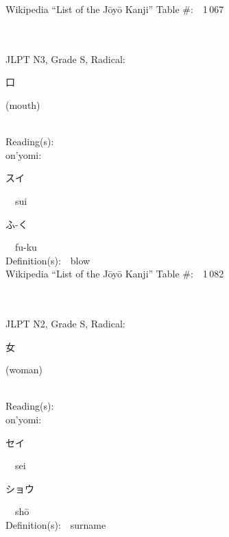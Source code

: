 \begin{multicols}{2}
Wikipedia ``List of the J\=oy\=o Kanji'' Table \#:\ \ 1\,067 \\
\ \ \\
{\fontsize{34pt}{40pt}  }\ \ \\  %
{JLPT N3, Grade S, Radical:\ \ {\begin{CJK}{UTF8}{min} 口 \end{CJK}} (mouth) } \\
Reading(s):\ \ \\
{\hspace*{1em}}on'yomi:\ \ \\
{\hspace*{2em}}{\begin{CJK}{UTF8}{min} スイ \end{CJK}}\ \ sui\ \ \\
{\hspace*{2em}}{\begin{CJK}{UTF8}{min} ふ-く \end{CJK}}\ \ fu-ku\ \ \\
Definition(s):\ \ blow \\
Wikipedia ``List of the J\=oy\=o Kanji'' Table \#:\ \ 1\,082 \\
\ \ \\
{\fontsize{34pt}{40pt}  }\ \ \\  %
{JLPT N2, Grade S, Radical:\ \ {\begin{CJK}{UTF8}{min} 女 \end{CJK}} (woman) } \\
Reading(s):\ \ \\
{\hspace*{1em}}on'yomi:\ \ \\
{\hspace*{2em}}{\begin{CJK}{UTF8}{min} セイ \end{CJK}}\ \ sei\ \ \\
{\hspace*{2em}}{\begin{CJK}{UTF8}{min} ショウ \end{CJK}}\ \ sh\=o\ \ \\
Definition(s):\ \ surname \\

\end{multicols}
